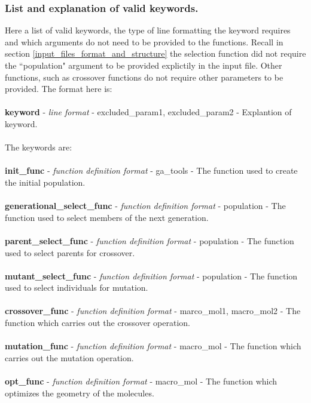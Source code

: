\documentclass{article}
\begin{document}
\subsubsection{List and explanation of valid keywords.}
\label{list and explanation of valid keywords.}
Here a list of valid keywords, the type of line formatting the keyword requires and which arguments do not need to be provided to the functions. Recall in section \ref{input_files_format_and_structure} the selection function did not require the ``population" argument to be provided explictily in the input file. Other functions, such as crossover functions do not require other parameters to be provided. The format here is:
\\
\\
\textbf{keyword} - \textit{line format} - excluded\_param1, excluded\_param2 - Explantion of keyword.
\\
\\
The keywords are:
\\
\\
\textbf{init\_func} - \textit{function definition format} - ga\_tools - The function used to create the initial population.
\\
\\
\textbf{generational\_select\_func} - \textit{function definition format} - population - The function used to select members of the next generation.
\\
\\
\textbf{parent\_select\_func} - \textit{function definition format} - population - The function used to select parents for crossover.
\\
\\
\textbf{mutant\_select\_func} - \textit{function definition format} - population - The function used to select individuals for mutation.
\\
\\
\textbf{crossover\_func} - \textit{function definition format} - marco\_mol1, macro\_mol2 - The function which carries out the crossover operation.
\\
\\
\textbf{mutation\_func} - \textit{function definition format} - macro\_mol - The function which carries out the mutation operation.
\\
\\
\textbf{opt\_func} - \textit{function definition format} - macro\_mol - The function which optimizes the geometry of the molecules.
\\
\\
\end{document}
